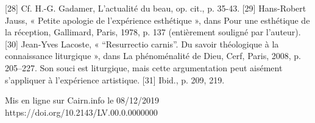     [28]
    Cf. H.-G. Gadamer, L’actualité du beau, op. cit., p. 35-43.
    [29]
    Hans-Robert Jauss, « Petite apologie de l’expérience esthétique », dans Pour une esthétique de la réception, Gallimard, Paris, 1978, p. 137 (entièrement souligné par l’auteur).
    [30]
    Jean-Yves Lacoste, « “Resurrectio carnis”. Du savoir théologique à la connaissance liturgique », dans La phénoménalité de Dieu, Cerf, Paris, 2008, p. 205–227. Son souci est liturgique, mais cette argumentation peut aisément s’appliquer à l’expérience artistique.
    [31]
    Ibid., p. 209, 219.

    Mis en ligne sur Cairn.info le 08/12/2019
    https://doi.org/10.2143/LV.00.0.0000000 
